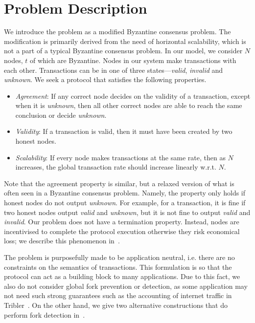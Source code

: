 \section{Problem Description}
\label{sec:description}
We introduce the problem as a modified Byzantine consensus problem.
The modification is primarily derived from the need of horizontal scalability,
which is not a part of a typical Byzantine consensus problem.
In our model, we consider $N$ nodes, $t$ of which are Byzantine.
Nodes in our system make transactions with each other.
Transactions can be in one of three states---\emph{valid}, \emph{invalid} and \emph{unknown}.
We seek a protocol that satisfies the following properties.
\begin{itemize}
    \item \emph{Agreement}:
        If any correct node decides on the validity of a transaction, except when it is \emph{unknown},
        then all other correct nodes are able to reach the same conclusion or decide \emph{unknown}.
    \item \emph{Validity}:
        If a transaction is valid, then it must have been created by two honest nodes.
    \item \emph{Scalability}:
        If every node makes transactions at the same rate,
        then as $N$ increases,
        the global transaction rate should increase linearly w.r.t. $N$.
\end{itemize}

Note that the agreement property is similar, but a relaxed version of what is often seen in a Byzantine consensus problem.
Namely, the property only holds if honest nodes do not output \emph{unknown}.
For example, for a transaction, it is fine if two honest nodes output \emph{valid} and \emph{unknown}, but it is not fine to output \emph{valid} and \emph{invalid}.
Our problem does not have a termination property.
Instead, nodes are incentivised to complete the protocol execution otherwise they risk economical loss;
we describe this phenomenon in~.

The problem is purposefully made to be application neutral,
i.e. there are no constraints on the semantics of transactions.
This formulation is so that the protocol can act as a building block to many applications.
Due to this fact, we also do not consider global fork prevention or detection,
as some application may not need such strong guarantees such as the accounting of internet traffic in Tribler~\cite{pimotte, pouwelse2008tribler}.
On the other hand, we give two alternative constructions that do perform fork detection in~.

